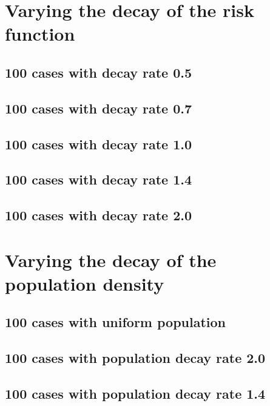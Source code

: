 \section{Varying the decay of the risk function}

\subsection{100 cases with decay rate 0.5}


\subsection{100 cases with decay rate 0.7}


\subsection{100 cases with decay rate 1.0}


\subsection{100 cases with decay rate 1.4}


\subsection{100 cases with decay rate 2.0}


\section{Varying the decay of the population density}

\subsection{100 cases with uniform population}


\subsection{100 cases with population decay rate 2.0}


\subsection{100 cases with population decay rate 1.4}



